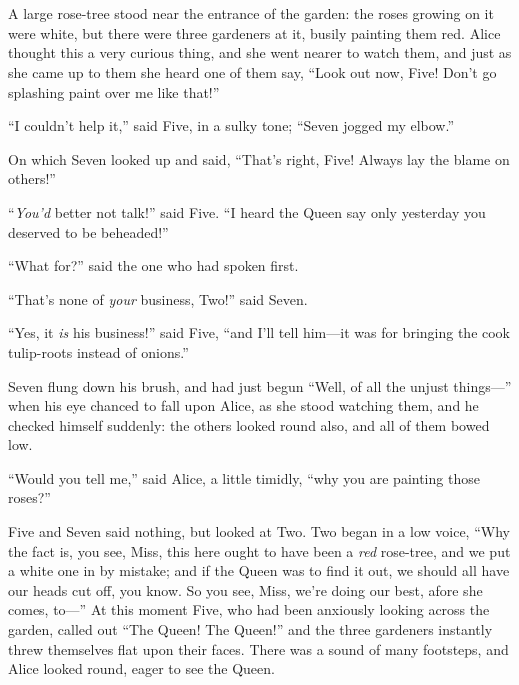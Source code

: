 \documentclass[book, 20pt]{extbook}
\begin{document}
\chapter*{}


A large rose-tree stood near the entrance of the garden: the roses
growing on it were white, but there were three gardeners at it, busily
painting them red. Alice thought this a very curious thing, and she went
nearer to watch them, and just as she came up to them she heard one of
them say, ``Look out now, Five! Don't go splashing paint over me like
that!''

``I couldn't help it,'' said Five, in a sulky tone; ``Seven jogged my
elbow.''

On which Seven looked up and said, ``That's right, Five! Always lay the
blame on others!''

``\emph{You'd} better not talk!'' said Five. ``I heard the Queen say
only yesterday you deserved to be beheaded!''

``What for?'' said the one who had spoken first.

``That's none of \emph{your} business, Two!'' said Seven.

``Yes, it \emph{is} his business!'' said Five, ``and I'll tell him---it
was for bringing the cook tulip-roots instead of onions.''

Seven flung down his brush, and had just begun ``Well, of all the unjust
things---'' when his eye chanced to fall upon Alice, as she stood
watching them, and he checked himself suddenly: the others looked round
also, and all of them bowed low.

``Would you tell me,'' said Alice, a little timidly, ``why you are
painting those roses?''

Five and Seven said nothing, but looked at Two. Two began in a low
voice, ``Why the fact is, you see, Miss, this here ought to have been a
\emph{red} rose-tree, and we put a white one in by mistake; and if the
Queen was to find it out, we should all have our heads cut off, you
know. So you see, Miss, we're doing our best, afore she comes, to---''
At this moment Five, who had been anxiously looking across the garden,
called out ``The Queen! The Queen!'' and the three gardeners instantly
threw themselves flat upon their faces. There was a sound of many
footsteps, and Alice looked round, eager to see the Queen.
\end{document}
